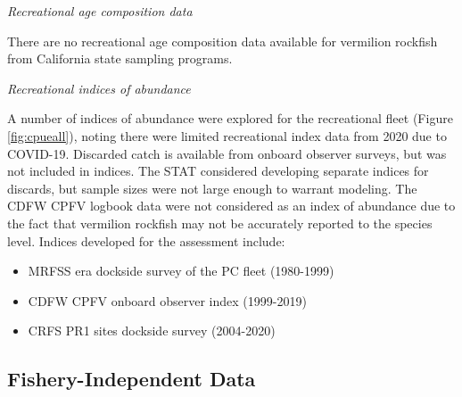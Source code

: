 \documentclass[11pt,
  english,
]{article}
\begin{document}
\emph{Recreational age composition data}

There are no recreational age composition data available for vermilion rockfish from California state sampling programs.

\emph{Recreational indices of abundance}

A number of indices of abundance were explored for the recreational fleet (Figure \ref{fig:cpueall}), noting there were limited recreational index data from 2020 due to COVID-19. Discarded catch is available from onboard observer surveys, but was not included in indices. The STAT considered developing separate indices for discards, but sample sizes were not large enough to warrant modeling. The CDFW CPFV logbook data were not considered as an index of abundance due to the fact that vermilion rockfish may not be accurately reported to the species level. Indices developed for the assessment include:


\begin{itemize}
\item

  MRFSS era dockside survey of the PC fleet (1980-1999)

  \tagmcend\tagstructend\tagstructend
\item

  CDFW CPFV onboard observer index (1999-2019)

  \tagmcend\tagstructend\tagstructend
\item

  CRFS PR1 sites dockside survey (2004-2020)

  \tagmcend\tagstructend\tagstructend
\end{itemize}

\tagstructend


\hypertarget{fishery-independent-data}{%
\subsection{Fishery-Independent Data}\label{fishery-independent-data}}

\leavevmode\tagmcend\tagstructend

\end{document}
